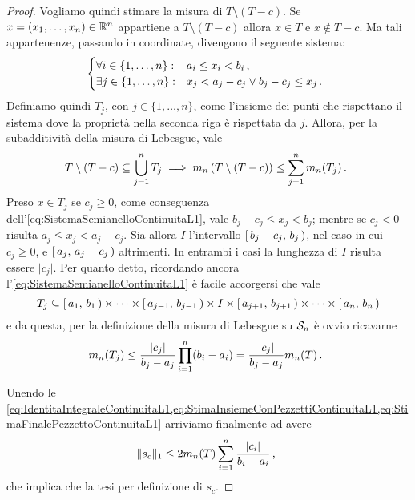 \begin{proof}
	Vogliamo quindi stimare la misura di $T\setminus\left(T-c\right)$. 
	Se $x=(x_1,\dots,x_n)\in\R^n$ appartiene a $T\setminus\left(T-c\right)$ allora $x\in T$ e $x\not\in T-c$. Ma tali appartenenze, passando in coordinate, divengono il seguente sistema:
	\begin{equation}\label{eq:SistemaSemianelloContinuitaL1}
		\begin{cases}
			\forall i\in\{1,\dots,n\}: &a_i\le x_i<b_i \virgola\\
			\exists j\in\{1,\dots,n\}: &x_j<a_j-c_j \vee b_j-c_j\le x_j \punto
		\end{cases}
	\end{equation}
	Definiamo quindi $T_j$, con $j\in\{1,\dots,n\}$, come l'insieme dei punti che rispettano il sistema dove la proprietà nella seconda riga è rispettata da $j$.
	Allora, per la subadditività della misura di Lebesgue, vale
	\begin{equation}\label{eq:StimaInsiemeConPezzettiContinuitaL1}
		T\setminus\left(T-c\right)\subseteq \bigcup_{j=1}^n T_j \implies m_n\left(T\setminus\left(T-c\right)\right)\le \sum_{j=1}^n m_n(T_j) \punto
	\end{equation}
	Preso $x\in T_j$ se $c_j\ge 0$, come conseguenza dell'\cref{eq:SistemaSemianelloContinuitaL1}, vale $b_j-c_j\le x_j<b_j$; mentre se $c_j<0$ risulta $a_j\le x_j<a_j-c_j$. Sia allora $I$ l'intervallo $\co{b_j-c_j}{b_j}$, nel caso in cui $c_j\ge 0$, e $\co{a_j}{a_j-c_j}$ altrimenti. In entrambi i casi la lunghezza di $I$ risulta essere $\lvert c_j \rvert$.
	Per quanto detto, ricordando ancora l'\cref{eq:SistemaSemianelloContinuitaL1} è facile accorgersi che vale
	\begin{equation*}
		T_j\subseteq \co{a_1}{b_1}\times\cdots\times\co{a_{j-1}}{b_{j-1}}\times I\times\co{a_{j+1}}{b_{j+1}}\times\cdots\times \co{a_n}{b_n}
	\end{equation*}
	e da questa, per la definizione della misura di Lebesgue su $\S_n$ è ovvio ricavarne
	\begin{equation}\label{eq:StimaFinalePezzettoContinuitaL1}
		m_n(T_j)\le \frac{\lvert c_j\rvert }{b_j-a_j} \prod_{i=1}^n (b_i-a_i)=\frac{\lvert c_j\rvert }{b_j-a_j} m_n(T) \punto
	\end{equation}
	
	Unendo le \cref{eq:IdentitaIntegraleContinuitaL1,eq:StimaInsiemeConPezzettiContinuitaL1,eq:StimaFinalePezzettoContinuitaL1} arriviamo finalmente ad avere
	\begin{equation*}
		\LNorm{s_c}\le 2m_n(T)\sum_{i=1}^n \frac{\lvert c_i\rvert }{b_i-a_i}\virgola
	\end{equation*}
	che implica che la tesi per definizione di $s_c$.
\end{proof}



